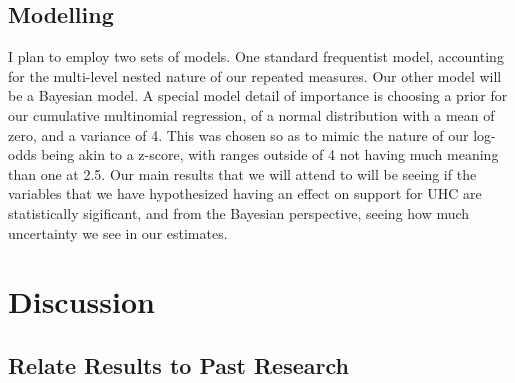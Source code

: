 \documentclass[
]{article}
\begin{document}
\hypertarget{modelling}{%
\subsection{Modelling}\label{modelling}}

I plan to employ two sets of models. One standard frequentist model,
accounting for the multi-level nested nature of our repeated measures.
Our other model will be a Bayesian model. A special model detail of
importance is choosing a prior for our cumulative multinomial
regression, of a normal distribution with a mean of zero, and a variance
of 4. This was chosen so as to mimic the nature of our log-odds being
akin to a z-score, with ranges outside of 4 not having much meaning than
one at 2.5. Our main results that we will attend to will be seeing if
the variables that we have hypothesized having an effect on support for
UHC are statistically sigificant, and from the Bayesian perspective,
seeing how much uncertainty we see in our estimates.

\hypertarget{discussion}{%
\section{Discussion}\label{discussion}}

\hypertarget{relate-results-to-past-research}{%
\subsection{Relate Results to Past
Research}\label{relate-results-to-past-research}}
\end{document}
